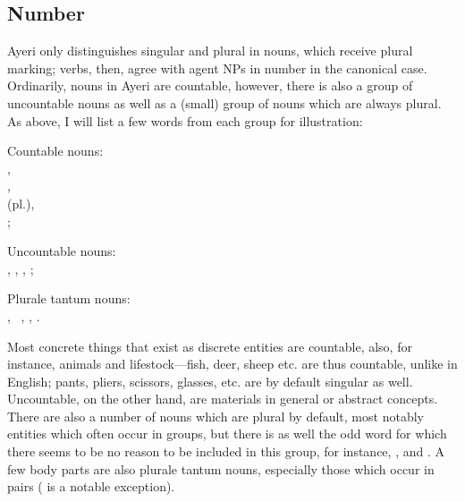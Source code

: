 
\subsection{Number}

Ayeri only distinguishes singular and plural in nouns, which receive plural 
marking; verbs, then, agree with agent NPs in number in the canonical case. 
Ordinarily, nouns in Ayeri are countable, however, there is also a group of 
uncountable nouns as well as a (small) group of nouns which are always plural. 
As above, I will list a few words from each group for illustration:

\pex
	\a Countable nouns:\label{ex:plurals}\\[0.5\baselineskip]
			\makebox[2em][c]{---}
			, %
				\\[0.5\baselineskip]
			\makebox[2em][c]{---}
			, %
				\\[0.5\baselineskip]
			\makebox[2em][c]{---}
			 (pl.),%
				\\[0.5\baselineskip]
			\makebox[2em][c]{---}
			;
	
	\a Uncountable nouns:\\
		, 
		, 
		, 
		;
	
	\a Plurale tantum nouns:\\
		,\footnotemark~
		, 
		, 
		.
\xe


Most concrete things that exist as discrete entities are countable, also, for 
instance, animals and lifestock---fish, deer, sheep etc. are thus countable, 
unlike in English; pants, pliers, scissors, glasses, etc. are by default 
singular as well. Uncountable, on the other hand, are materials in general or 
abstract concepts. There are also a number of nouns which are plural by default, 
most notably entities which often occur in groups, but there is as well the odd 
word for which there seems to be no reason to be included in this group, for 
instance, , and . A few body parts are also plurale tantum nouns, 
especially those which occur in pairs ( is a notable 
exception).

